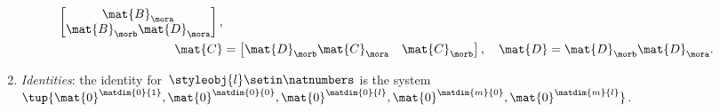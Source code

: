 \begin{ctdefinition}
\begin{enumerate}
\begin{equation}
\begin{aligned}
\begin{bmatrix}
                                  \mat{B}_\mora \\
                                  \mat{B}_\morb\mat{D}_\mora
                              \end{bmatrix}, \\
                      \mat{C}  & =\begin{bmatrix}
                                      \mat{D}_\morb\mat{C}_\mora & \mat{C}_\morb
                                  \end{bmatrix}, \quad
                      \mat{D}=\mat{D}_\morb\mat{D}_\mora.
                  \end{aligned}
              \end{equation}
        \item \emph{Identities}: the identity for~$\styleobj{l}\setin \natnumbers$ is the system~$\tup{\mat{0}^{\matdim{0}{1}},\mat{0}^{\matdim{0}{0}},\mat{0}^{\matdim{0}{l}},\mat{0}^{\matdim{m}{0}},\mat{0}^{\matdim{m}{l}}}$.
    \end{enumerate}
\end{ctdefinition}


